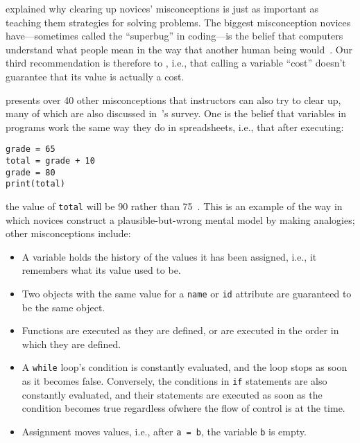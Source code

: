 
 explained why clearing up novices' misconceptions
is just as important as teaching them strategies for solving problems.
The biggest misconception novices have---sometimes called the ``superbug'' in coding---is
the belief that computers understand what people mean in the way that another human being would~\cite{Pea1986}.
Our third recommendation is therefore to ,
i.e.,
that calling a variable ``cost'' doesn't guarantee that its value is actually a cost.

\cite{Sorv2018} presents over 40 other misconceptions that instructors can also try to clear up,
many of which are also discussed in~\cite{Qian2017}'s survey.
One is the belief that variables in programs work the same way they do in spreadsheets,
i.e.,
that after executing:

\begin{verbatim}
grade = 65
total = grade + 10
grade = 80
print(total)
\end{verbatim}

\noindent
the value of \texttt{total} will be 90 rather than 75~\cite{Kohn2017}.
This is an example of the way in which novices construct a plausible-but-wrong mental model by making analogies;
other misconceptions include:

\begin{itemize}

\item
  A variable holds the history of the values it has been assigned,
  i.e., it remembers what its value used to be.

\item
  Two objects with the same value for a \texttt{name} or \texttt{id} attribute
  are guaranteed to be the same object.

\item
  Functions are executed as they are defined,
  or are executed in the order in which they are defined.

\item
  A \texttt{while} loop's condition is constantly evaluated,
  and the loop stops as soon as it becomes false.
  Conversely,
  the conditions in \texttt{if} statements are also constantly evaluated,
  and their statements are executed as soon as the condition becomes true
  regardless ofwhere the flow of control is at the time.

\item
  Assignment moves values,
  i.e.,
  after \texttt{a\ =\ b}, the variable \texttt{b} is empty.

\end{itemize}

